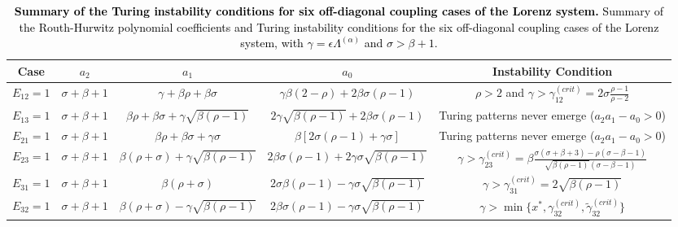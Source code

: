 \documentclass[aps,showpacs,preprintnumbers,amsmath,amssymb,twocolumn,superscriptaddress,floatfix,nofootinbib,10pt,pre]{revtex4-1}
\begin{document}
\begin{table}[ht!]
\centering
\begin{ruledtabular}
\begin{tabular}{ccccc}
\textbf{Case} & $a_2$ & $a_1$ & $a_0$ & \textbf{Instability Condition} \\ \hline
$E_{12} = 1$ & $\sigma+\beta+1$ & $\gamma+\beta\rho+\beta\sigma$ & $\gamma\beta(2-\rho)+2\beta\sigma(\rho-1)$ & $\rho > 2$ and $\gamma > \gamma_{12}^{(crit)} = 2\sigma\frac{\rho-1}{\rho-2}$ \\
$E_{13} = 1$ & $\sigma+\beta+1$ & $\beta\rho+\beta\sigma+\gamma\sqrt{\beta(\rho-1)}$ & $2\gamma\sqrt{\beta(\rho-1)}+2\beta\sigma(\rho-1)$ & Turing patterns never emerge ($a_2a_1 - a_0 > 0$) \\
$E_{21} = 1$ & $\sigma+\beta+1$ & $\beta\rho+\beta\sigma+\gamma\sigma$ & $\beta[2\sigma(\rho-1)+\gamma\sigma]$ & Turing patterns never emerge ($a_2a_1 - a_0 > 0$) \\
$E_{23} = 1$ & $\sigma+\beta+1$ & $\beta(\rho+\sigma)+\gamma\sqrt{\beta(\rho-1)}$ & $2\beta\sigma(\rho-1)+2\gamma\sigma\sqrt{\beta(\rho-1)}$ & $\gamma > \gamma_{23}^{(crit)} = \beta\frac{\sigma(\sigma+\beta+3)-\rho(\sigma-\beta-1)}{\sqrt{\beta(\rho-1)}(\sigma-\beta-1)}$ \\
$E_{31} = 1$ & $\sigma+\beta+1$ & $\beta(\rho+\sigma)$ & $2\sigma\beta(\rho-1)-\gamma\sigma\sqrt{\beta(\rho-1)}$ & $\gamma > \gamma_{31}^{(crit)} = 2\sqrt{\beta(\rho-1)}$ \\
$E_{32} = 1$ & $\sigma+\beta+1$ & $\beta(\rho+\sigma)-\gamma\sqrt{\beta(\rho-1)}$ & $2\beta\sigma(\rho-1)-\gamma\sigma\sqrt{\beta(\rho-1)}$ & $\gamma > \min\{x^*, \gamma_{32}^{(crit)}, \tilde{\gamma}_{32}^{(crit)}\}$ \\
\end{tabular}
\end{ruledtabular}
\caption{\textcolor{black}{\textbf{Summary of the Turing instability conditions for six off-diagonal coupling cases of the Lorenz system.} Summary of the Routh-Hurwitz polynomial coefficients and Turing instability conditions for the six off-diagonal coupling cases of the Lorenz system, with $\gamma = \epsilon\Lambda^{(\alpha)}$ and $\sigma > \beta + 1$.}}
\label{tab:lorenz_summary}
\end{table}
\end{document}
